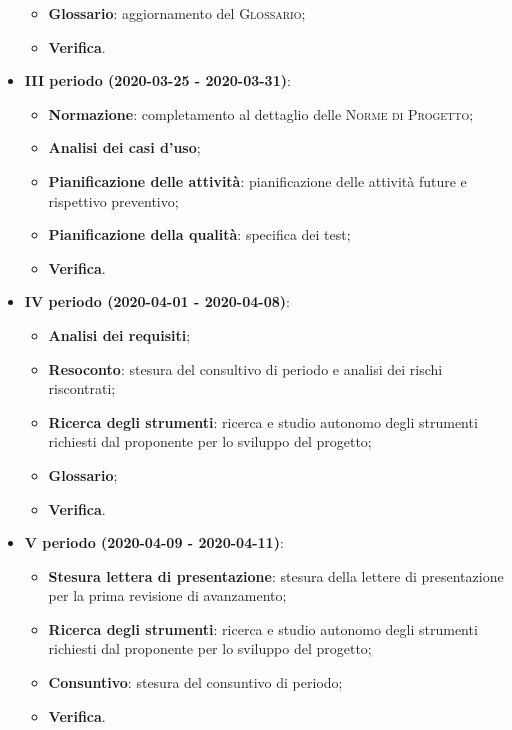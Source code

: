 \documentclass[../piano-di-progetto.tex]{subfiles}
\begin{document}
\begin{itemize}
\begin{itemize}
                \item \textbf{Glossario}: aggiornamento del \textsc{Glossario};
                \item \textbf{Verifica}.
            \end{itemize}
        \item \textbf{III periodo (2020-03-25 - 2020-03-31)}:
        \begin{itemize}
            \item \textbf{Normazione}: completamento al dettaglio delle \textsc{Norme di Progetto};
            \item \textbf{Analisi dei casi d'uso};
            \item \textbf{Pianificazione delle attività}: pianificazione delle attività future e rispettivo preventivo;
            \item \textbf{Pianificazione della qualità}: specifica dei test;
            \item \textbf{Verifica}.
        \end{itemize}
        \item \textbf{IV periodo (2020-04-01 - 2020-04-08)}:
        \begin{itemize}
            \item \textbf{Analisi dei requisiti};
            \item \textbf{Resoconto}: stesura del consultivo di periodo e analisi dei rischi riscontrati;
            \item \textbf{Ricerca degli strumenti}: ricerca e studio autonomo degli strumenti richiesti dal proponente per lo sviluppo del progetto;
            \item \textbf{Glossario};
            \item \textbf{Verifica}.

        \end{itemize}

        \item \textbf{V periodo (2020-04-09 - 2020-04-11)}:
        \begin{itemize}
            \item \textbf{Stesura lettera di presentazione}: stesura della lettere di presentazione per la prima revisione di avanzamento;
            \item \textbf{Ricerca degli strumenti}: ricerca e studio autonomo degli strumenti richiesti dal proponente per lo sviluppo del progetto;
            \item \textbf{Consuntivo}: stesura del consuntivo di periodo;
            \item \textbf{Verifica}.
        \end{itemize}
    \end{itemize}
\end{document}
